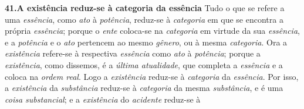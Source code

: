 \documentclass[12pt,a4paper]{article}
\newcommand{\tese}[2]{\bigskip\noindent\textbf{#1.\quad #2}\;\textemdash\;}
\begin{document}
\tese{41}{A existência reduz-se à categoria da essência} Tudo o que se refere a
uma \emph{essência}, como \emph{ato} à \emph{potência}, reduz-se à
\emph{categoria} em que se encontra a própria \emph{essência}; porque o
\emph{ente} coloca-se na \emph{categoria} em virtude da sua \emph{essência}, e a
\emph{potência} e o \emph{ato} pertencem ao mesmo \emph{gênero}, ou à mesma
\emph{categoria}. Ora a \emph{existência} refere-se à respectiva \emph{essência}
como \emph{ato} à \emph{potência}; porque a \emph{existência}, como dissemos, é
a \emph{última atualidade}, que completa a \emph{essência} e a coloca na
\emph{ordem real}. Logo a \emph{existência} reduz-se à \emph{categoria} da
\emph{essência}. \textemdash{} Por isso, a \emph{existência} da \emph{substância}
reduz-se à \emph{categoria} da mesma \emph{substância}, e é uma \emph{coisa
substancial}; e a \emph{existência} do \emph{acidente} reduz-se à
\end{document}
